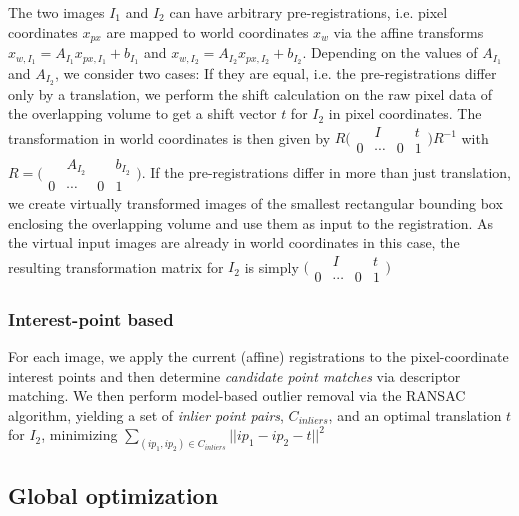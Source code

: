 The two images $I_1$ and $I_2$ can have arbitrary pre-registrations, i.e. pixel coordinates $x_{px}$ are mapped to world coordinates $x_w$ via the affine transforms $x_{w,I_1} = A _{I_1}x_{px,I_1} + b_{I_1}$ and $x_{w,I_2} = A _{I_2}x_{px,I_2} + b_{I_2}$. Depending on the values of $ A _{I_1}$ and $ A _{I_2}$, we consider two cases: If they are equal, i.e. the pre-registrations differ only by a translation, we perform the shift calculation on the raw pixel data of the overlapping volume to get a shift vector $t$ for $I_2$ in pixel coordinates. The transformation in world coordinates is then given by $R \bigl(\begin{smallmatrix}  & I & & t \\  0 & \cdots & 0 & 1 \end{smallmatrix}\bigr) R^{-1} $ with $R = \bigl(\begin{smallmatrix}  & A_{I_2} & & b_{I_2} \\  0 & \cdots & 0 & 1 \end{smallmatrix}\bigr)$. If the pre-registrations differ in more than just translation, we create virtually transformed images of the smallest rectangular bounding box enclosing the overlapping volume and use them as input to the registration. As the virtual input images are already in world coordinates in this case, the resulting transformation matrix for $I_2$ is simply $\bigl(\begin{smallmatrix}  & I & & t \\  0 & \cdots & 0 & 1 \end{smallmatrix}\bigr)$

\subsubsection{Interest-point based}

For each image, we apply the current (affine) registrations to the pixel-coordinate interest points and then determine \emph{candidate point matches} via descriptor matching. We then perform model-based outlier removal via the RANSAC algorithm, yielding a set of \emph{inlier point pairs}, $C_{inliers}$, and an optimal translation $t$ for $I_2$, minimizing $\sum_{(ip_1, ip_2) \in C_{inliers} }{|| ip_1 - ip_2 - t||^2}$

\subsection{Global optimization}

